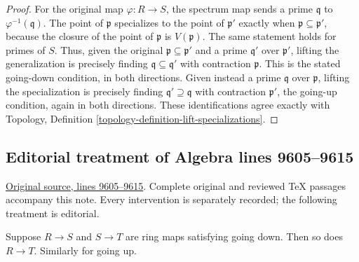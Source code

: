 \begin{proof}
For the original map $\varphi:R\to S$, the spectrum map
sends a prime $\mathfrak q$ to $\varphi^{-1}(\mathfrak q)$.
The point of $\mathfrak p$ specializes to the point of
$\mathfrak p'$ exactly when $\mathfrak p\subseteq\mathfrak p'$,
because the closure of the point of $\mathfrak p$ is
$V(\mathfrak p)$. The same statement holds for primes of $S$.
Thus, given the original $\mathfrak p\subseteq\mathfrak p'$
and a prime $\mathfrak q'$ over $\mathfrak p'$, lifting
the generalization is precisely finding
$\mathfrak q\subseteq\mathfrak q'$ with contraction
$\mathfrak p$. This is the stated going-down condition,
in both directions. Given instead a prime $\mathfrak q$
over $\mathfrak p$, lifting the specialization is precisely
finding $\mathfrak q'\supseteq\mathfrak q$ with contraction
$\mathfrak p'$, the going-up condition, again in both
directions. These identifications agree exactly with
Topology, Definition \ref{topology-definition-lift-specializations}.
\end{proof}


\subsection{Editorial treatment of Algebra lines 9605--9615}

\hypertarget{algebra-context-107}{}

\noindent\href{https://github.com/stacks/stacks-project/blob/a04446e57ec1fbc252a871afcec7752fb2807b14/algebra.tex\#L9605}{Original source, lines 9605--9615}. Complete original and reviewed TeX passages accompany this note. Every intervention is separately recorded; the following treatment is editorial.


\begin{lemma}
\label{editorial-source-lemma-going-up-down-composition}
Suppose $R \to S$ and $S \to T$ are ring maps satisfying
going down. Then so does $R \to T$. Similarly for going up.
\end{lemma}


